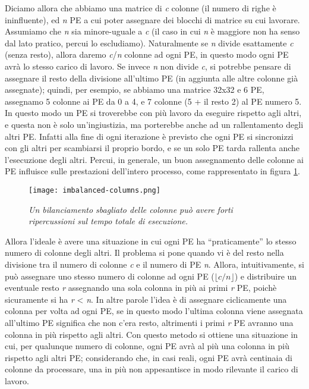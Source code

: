 Diciamo allora che abbiamo una matrice di \textit{c} colonne (il numero di righe \`e ininfluente), ed \textit{n} PE a cui poter assegnare dei blocchi di matrice su cui lavorare. Assumiamo che \textit{n} sia minore-uguale a \textit{c} (il caso in cui \textit{n} \`e maggiore non ha senso dal lato pratico, percui lo escludiamo). Naturalmente se \textit{n} divide esattamente \textit{c} (senza resto), allora daremo \textit{c}/\textit{n} colonne ad ogni PE, in questo modo ogni PE avr\`a lo stesso carico di lavoro. Se invece \textit{n} non divide \textit{c}, si potrebbe pensare di assegnare il resto della divisione all'ultimo PE (in aggiunta alle altre colonne gi\`a assegnate); quindi, per esempio, se abbiamo una matrice 32x32 e 6 PE, assegnamo 5 colonne ai PE da 0 a 4, e 7 colonne (5 + il resto 2) al PE numero 5. In questo modo un PE si troverebbe con pi\`u lavoro da eseguire rispetto agli altri, e questa non \`e solo un'ingiustizia, ma porterebbe anche ad un rallentamento degli altri PE. Infatti alla fine di ogni iterazione \`e previsto che ogni PE si sincronizzi con gli altri per scambiarsi il proprio bordo, e se un solo PE tarda rallenta anche l'esecuzione degli altri. Percui, in generale, un buon assegnamento delle colonne ai PE influisce sulle prestazioni dell'intero processo, come rappresentato in figura \ref{fig:imbalanced_columns}.
\begin{figure}[ht]
  \centering
  \texttt{[image: imbalanced-columns.png]}
  \caption{\emph{Un bilanciamento sbagliato delle colonne pu\`o avere forti ripercussioni sul tempo totale di esecuzione.}}
  \label{fig:imbalanced_columns}
\end{figure}

Allora l'ideale \`e avere una situazione in cui ogni PE ha ``praticamente'' lo stesso numero di colonne degli altri. Il problema si pone quando vi \`e del resto nella divisione tra il numero di colonne \textit{c} e il numero di PE \textit{n}. Allora, intuitivamente, si pu\`o assegnare uno stesso numero di colonne ad ogni PE ($ \lfloor c/n \rfloor $) e distribuire un eventuale resto \textit{r} assegnando una sola colonna in pi\`u ai primi \textit{r} PE, poich\`e sicuramente si ha \textit{r} < \textit{n}. In altre parole l'idea \`e di assegnare ciclicamente una colonna per volta ad ogni PE, se in questo modo l'ultima colonna viene assegnata all'ultimo PE significa che non c'era resto, altrimenti i primi \textit{r} PE avranno una colonna in pi\`u rispetto agli altri. Con questo metodo si ottiene una situazione in cui, per qualunque numero di colonne, ogni PE avr\`a al pi\`u una colonna in pi\`u rispetto agli altri PE; considerando che, in casi reali, ogni PE avr\`a centinaia di colonne da processare, una in pi\`u non appesantisce in modo rilevante il carico di lavoro.

